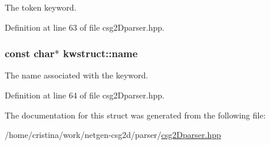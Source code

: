 The token keyword. 



Definition at line 63 of file csg2Dparser.hpp.

\hypertarget{structkwstruct_a2e2497a18afa4c1a9dca03f6007f2713}{
\subsubsection[{name}]{\setlength{\rightskip}{0pt plus 5cm}const char$\ast$ {\bf kwstruct::name}}}
\label{structkwstruct_a2e2497a18afa4c1a9dca03f6007f2713}


The name associated with the keyword. 



Definition at line 64 of file csg2Dparser.hpp.



The documentation for this struct was generated from the following file:\begin{DoxyCompactItemize}
\item 
/home/cristina/work/netgen-\/csg2d/parser/\hyperlink{csg2_dparser_8hpp}{csg2Dparser.hpp}\end{DoxyCompactItemize}
